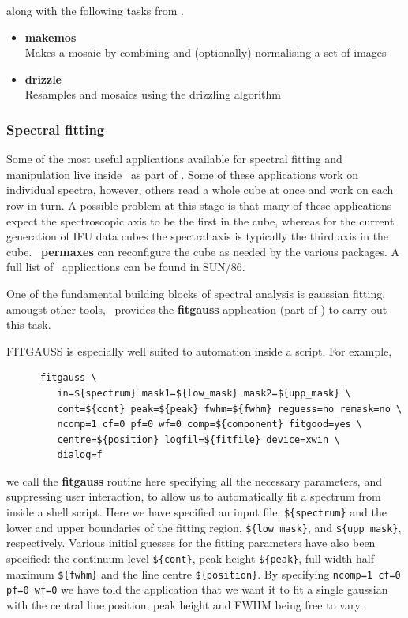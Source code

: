 \documentclass[twoside,11pt]{article}
\newcommand{\xref}[3]{#1}
\begin{document}
{along with the following tasks from \CCDPACKref.

\begin{itemize}
\item{\xref{{\bf makemos}}{sun139}{MAKEMOS}}\\
Makes a mosaic by combining and (optionally) normalising a set of images 
\item{\xref{{\bf drizzle}}{sun139}{DRIZZLE}}\\
Resamples and mosaics using the drizzling algorithm
\end{itemize}

\subsubsection{Spectral fitting}

Some of the most useful applications available for spectral fitting
and manipulation live inside \FIGAROref\ as part of \SPECDREref.  Some
of these applications work on individual spectra, however, others read
a whole cube at once and work on each row in turn.  A possible problem
at this stage is that many of these applications expect the
spectroscopic axis to be the first in the cube, whereas for the
current generation of IFU data cubes the spectral axis is typically the
third axis in the cube.  \KAPPA\ \xref{{\bf permaxes}}{sun95}{PERMAXES}
can reconfigure the cube as needed by the various packages.   A full 
list of \xref{\SPECDRE\ applications}{sun86}{classifspecdre} can be 
found in SUN/86. 

One of the fundamental building blocks of spectral analysis is
gaussian fitting, amougst other tools, \FIGARO\ provides the
\xref{{\bf fitgauss}}{sun86}{FITGAUSS} application (part of \SPECDRE)
to carry out this task.

FITGAUSS is especially well suited to automation inside a script.
For example,

\small\begin{verbatim}
      fitgauss \
         in=${spectrum} mask1=${low_mask} mask2=${upp_mask} \
         cont=${cont} peak=${peak} fwhm=${fwhm} reguess=no remask=no \
         ncomp=1 cf=0 pf=0 wf=0 comp=${component} fitgood=yes \
         centre=${position} logfil=${fitfile} device=xwin \
         dialog=f 
\end{verbatim}\normalsize

we call the {\bf fitgauss} routine here specifying all the necessary
parameters, and suppressing user interaction, to allow us to
automatically fit a spectrum from inside a shell script.  Here we have
specified an input file, \verb+${spectrum}+ and the lower and upper
boundaries of the fitting region, \verb+${low_mask}+, and
\verb+${upp_mask}+, respectively.  Various initial guesses for the
fitting parameters have also been specified: the continuum level
\verb+${cont}+, peak height \verb+${peak}+, full-width half-maximum
\verb+${fwhm}+ and the line centre \verb+${position}+.  By specifying
\verb+ncomp=1 cf=0 pf=0 wf=0+ we have told the application that we
want it to fit a single gaussian with the central line position, peak
height and FWHM being free to vary.

}
\end{document}

